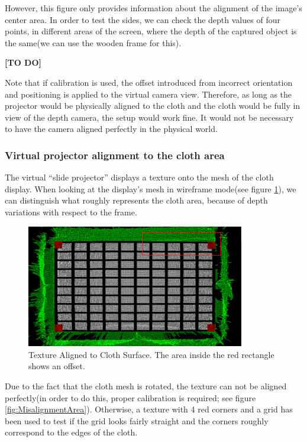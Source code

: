 \documentclass[]{article}
\begin{document}
 However, this figure only provides information about the alignment of the image's center area. In order to test the sides, we can check the depth values of four points, in different areas of the screen, where the depth of the captured object is the same(we can use the wooden frame for this).
 
 \textbf{[TO DO]}


Note that if calibration is used, the offset introduced from incorrect orientation and positioning is applied to the virtual camera view. Therefore, as long as the projector would be physically aligned to the cloth and the cloth would be fully in view of the depth camera, the setup would work fine. It would not be necessary to have the camera aligned perfectly in the physical world.

\subsubsection{Virtual projector alignment to the cloth area}

The virtual “slide projector” displays a texture onto the mesh of the cloth display. When looking at the display's mesh in wireframe mode(see figure \ref{fig:TextureAlignmentToMeshArea}), we can distinguish what roughly represents the cloth area, because of depth variations with respect to the frame. 

\begin{figure}[!hbtp]
    \centering
    \includegraphics[width=0.85\textwidth]{figures/TextureAlignmentToMeshArea.png}
    \caption{Texture Aligned to Cloth Surface. The area inside the red rectangle shows an offset.}
    \label{fig:TextureAlignmentToMeshArea}
\end{figure}

Due to the fact that the cloth mesh is rotated, the texture can not be aligned perfectly(in order to do this, proper calibration is required; see figure \ref{fig:MisalignmentArea}). Otherwise, a texture with 4 red corners and a grid has been used to test if the grid looks fairly straight and the corners roughly correspond to the edges of the cloth. 
\end{document}
